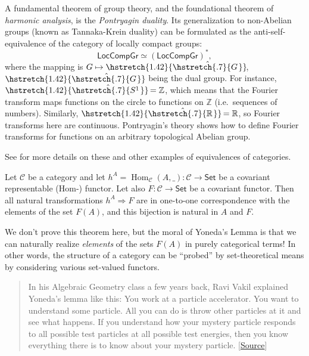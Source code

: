 \documentclass[english,letterpaper]{article}%
\numberwithin{equation}{section}
\numberwithin{figure}{section}
\numberwithin{table}{section}
\theoremstyle{definition}
\theoremstyle{definition}
\theoremstyle{definition}
\theoremstyle{plain}
\theoremstyle{plain}
\theoremstyle{plain}
\theoremstyle{plain}
\theoremstyle{remark}
\theoremstyle{remark}
\DeclareMathOperator{\Hom}{Hom}
\newcommand\wh[1]{\hstretch{1.42}{\hat{\hstretch{.7}{#1\mkern2mu}}}\mkern-2mu} %
\begin{document}
%
\begin{example}
A fundamental theorem of group theory, and the foundational theorem
of \emph{harmonic analysis}, is the \emph{Pontryagin duality}.
Its generalization to non-Abelian groups (known as Tannaka-Krein duality)
can be formulated as the anti-self-equivalence of the category of
locally compact groups:
\[
\mathsf{LocCompGr}\simeq\left(\mathsf{LocCompGr}\right)^{\ast},
\]
where the mapping is $G\mapsto\wh{G}$, $\wh{G}$ being the dual
group. For instance, $\wh{S^{1}}=\mathbb{Z}$, which means that the
Fourier transform maps functions on the circle to functions on $\mathbb{Z}$
(i.e.\ sequences of numbers). Similarly, $\wh{\mathbb{R}}=\mathbb{R}$,
so Fourier transforms here are continuous. Pontryagin's theory shows
how to define Fourier transforms for functions on an arbitrary topological
Abelian group.

See \cite[II.2]{GelMan} for more details on these and other examples
of equivalences of categories.
\end{example}
\begin{thm}\label{Yoneda}
Let $\mathcal{C}$ be a category and let $h^{A}=\Hom_{\mathcal{C}}\left(A,\_\right):\mathcal{C}\to\mathsf{Set}$
be a covariant representable (Hom-) functor. Let also $F:\mathcal{C}\to\mathsf{Set}$
be a covariant functor. Then all natural transformations $h^{A}\Longrightarrow F$
are in one-to-one correspondence with the elements of the set $F(A)$,
and this bijection is natural in $A$ and $F$.
\end{thm}
\begin{rem}
We don't prove this theorem here, but the moral of Yoneda's Lemma
is that we can naturally realize \emph{elements} of the sets
$F(A)$ in purely categorical terms! In other words, the structure of a category can be ``probed'' by set-theoretical means by considering various set-valued functors.
\end{rem}
\begin{quote}
\small In his Algebraic Geometry class a few years back, Ravi Vakil
explained Yoneda's lemma like this: You work at a particle accelerator.
You want to understand some particle. All you can do is throw other
particles at it and see what happens. If you understand how your mystery
particle responds to all possible test particles at all possible test
energies, then you know everything there is to know about your mystery
particle. {[}\href{https://mathoverflow.net/a/3223/22773}{Source}{]}
\end{quote}
\end{document}
